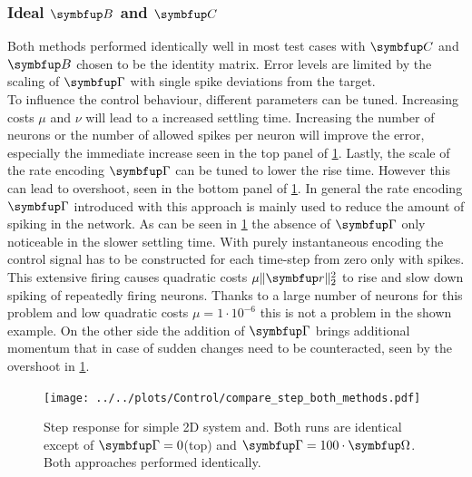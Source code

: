 \subsubsection{Ideal $\bmu{B}$ and $\bmu{C}$}
Both methods performed identically well in most test cases with $\bmu{C}$ and $\bmu{B}$ chosen to be the identity matrix. Error levels are limited by the scaling of $\bmu{\Gamma}$ with single spike deviations from the target. \\
To influence the control behaviour, different parameters can be tuned. Increasing costs $\mu$ and $\nu$ will lead to a increased settling time. Increasing the number of neurons or the number of allowed spikes per neuron will improve the error, especially the immediate increase seen in the top panel of \cref{fig:step_compare}. Lastly, the scale of the rate encoding $\bmu{\Gamma}$ can be tuned to lower the rise time. However this can lead to overshoot, seen in the bottom panel of \cref{fig:step_compare}. In general the rate encoding $\bmu{\Gamma}$ introduced with this approach is mainly used to reduce the amount of spiking in the network. As can be seen in \cref{fig:step_compare} the absence of $\bmu{\Gamma}$ only noticeable in the slower settling time. With purely instantaneous encoding the control signal has to be constructed for each time-step from zero only with spikes. This extensive firing causes quadratic costs $\mu\|\bmu{r}\|^2_2$ to rise and slow down spiking of repeatedly firing neurons. Thanks to a large number of neurons for this problem and low quadratic costs $\mu = 1\cdot10^{-6}$ this is not a problem in the shown example. On the other side the addition of $\bmu{\Gamma}$ brings additional momentum that in case of sudden changes need to be counteracted, seen by the overshoot in \cref{fig:step_compare}.\\
\begin{figure}
	\centering
	\texttt{[image: ../../plots/Control/compare\_step\_both\_methods.pdf]}
	\caption{Step response for simple 2D system and. Both runs are identical except of $\bmu{\Gamma} = 0$(top) and $\bmu{\Gamma} = 100\cdot\bmu{\Omega}$. Both approaches performed identically.}
	\label{fig:step_compare}
\end{figure}


